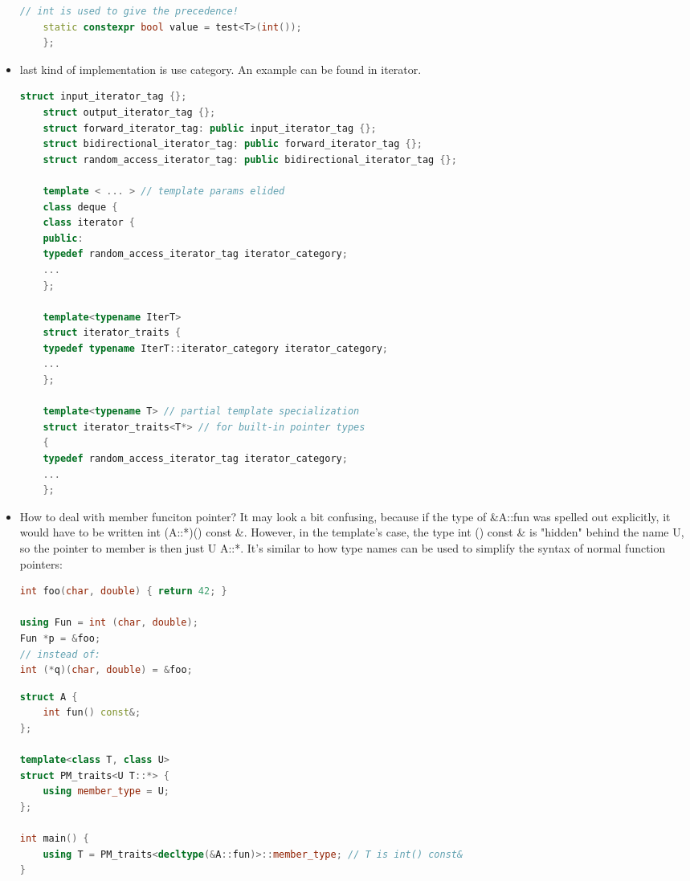 \documentclass[a4paper,12pt,twoside]{book}
\begin{document}
\begin{itemize}
\begin{lstlisting}[frame=single, language=c++]
	// int is used to give the precedence!
	static constexpr bool value = test<T>(int());
	};
	\end{lstlisting}
	
	\item last kind of implementation is use category. An example can be found in iterator.
	
	\begin{lstlisting}[frame=single, language=c++]
	struct input_iterator_tag {};
	struct output_iterator_tag {};
	struct forward_iterator_tag: public input_iterator_tag {};
	struct bidirectional_iterator_tag: public forward_iterator_tag {};
	struct random_access_iterator_tag: public bidirectional_iterator_tag {};
	
	template < ... > // template params elided
	class deque {
	class iterator {
	public:
	typedef random_access_iterator_tag iterator_category;
	...
	};
	
	template<typename IterT>
	struct iterator_traits {
	typedef typename IterT::iterator_category iterator_category;
	...
	};
	
	template<typename T> // partial template specialization
	struct iterator_traits<T*> // for built-in pointer types
	{
	typedef random_access_iterator_tag iterator_category;
	...
	};
	\end{lstlisting}


\item How to deal with member funciton pointer? It may look a bit confusing, because if the type of \&A::fun was spelled out explicitly, it would have to be written int (A::*)() const \&. However, in the template's case, the type int () const \& is "hidden" behind the name U, so the pointer to member is then just U A::*. It's similar to how type names can be used to simplify the syntax of normal function pointers:
	

\begin{lstlisting}[frame=single, language=c++]
int foo(char, double) { return 42; }

using Fun = int (char, double);
Fun *p = &foo;
// instead of:
int (*q)(char, double) = &foo;
\end{lstlisting}

	\begin{lstlisting}[frame=single, language=c++]
struct A {
	int fun() const&;
};

template<class T, class U>
struct PM_traits<U T::*> {
	using member_type = U;
};

int main() {
	using T = PM_traits<decltype(&A::fun)>::member_type; // T is int() const&
}


\end{lstlisting}
\end{itemize}
\end{document}

